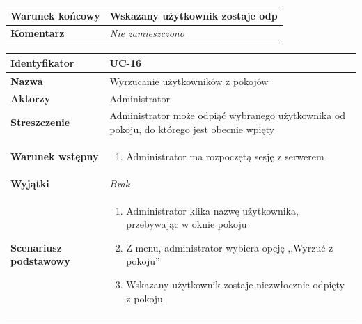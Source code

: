 \documentclass[11pt,oneside,a4paper,titlepage,onecolumn]{article}
\newenvironment{enumreq}
{ \begin{enumerate}[topsep=0pt,itemsep=-1ex,partopsep=1ex,parsep=1ex] }
{ \end{enumerate}                  }
\begin{document}
{\begin{tabular}{ | l | l | }
	\hline
		\parbox[t]{4cm}{\textbf{Warunek końcowy}} & \parbox[t]{11cm}{
			Wskazany użytkownik zostaje odp
		}
		\\
		
	\hline
		\parbox[t]{4cm}{\textbf{Komentarz}} & \parbox[t]{11cm}{
			\textit{Nie zamieszczono}
		}
		\\

	\hline
\end{tabular}

\vspace{2em}

\begin{tabular}{ | l | l | }
	\hline
		\textbf{Identyfikator} & 
		UC-16
		\\
		
	\hline
		\textbf{Nazwa} & 
		Wyrzucanie użytkowników z pokojów
		\\
		
	\hline
		\textbf{Aktorzy} & \parbox[t]{11cm}{
			Administrator
		}\\
		 
	\hline
		\parbox[t]{4cm}{\textbf{Streszczenie}} & \parbox[t]{11cm}{
			Administrator może odpiąć wybranego użytkownika od pokoju, do
			którego jest obecnie wpięty
			
		}\\
		
	\hline
		\parbox[t]{4cm}{\textbf{Warunek wstępny}} & \parbox[t]{11cm}{
			\begin{enumreq}
				\item Administrator ma rozpoczętą sesję z serwerem
			\end{enumreq}
				
		}
		\\
		
	\hline
		\parbox[t]{4cm}{\textbf{Wyjątki}} & \parbox[t]{11cm}{
			\textit{Brak}
			
		}
		\\

	\hline
		\parbox[t]{4cm}{\textbf{Scenariusz podstawowy}} & \parbox[t]{11cm}{
			\begin{enumreq}
				\item Administrator klika nazwę użytkownika, przebywając
				w oknie pokoju
				\item Z menu, administrator wybiera opcję ,,Wyrzuć z pokoju''
				\item Wskazany użytkownik zostaje niezwłocznie odpięty z 
				pokoju
			\end{enumreq}
		}
		\\
		

\end{tabular}}
\end{document}
